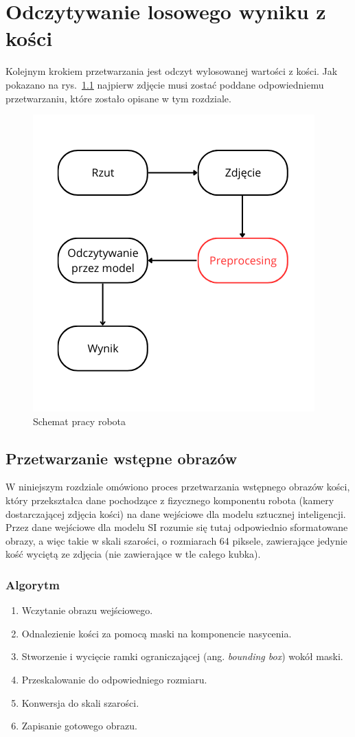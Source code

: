 \chapter{Odczytywanie losowego wyniku z kości}\label{ch:odczytywanie-losowego-wyniku-z-kosci}

Kolejnym krokiem przetwarzania jest odczyt wylosowanej wartości z kości.
Jak pokazano na rys.~\ref{fig:schemat_workflow}
najpierw zdjęcie musi zostać poddane odpowiedniemu przetwarzaniu, które zostało opisane w tym rozdziale.

\begin{figure}[H]
    \centering
    \includegraphics[width=0.5\linewidth]{chapters/04-czytanie/figures/schemat}
    \caption{Schemat pracy robota}
    \label{fig:schemat_workflow}
\end{figure}

\section{Przetwarzanie wstępne obrazów}\label{sec:preprocessing}

W niniejszym rozdziale omówiono proces przetwarzania wstępnego obrazów kości,
który przekształca dane pochodzące z fizycznego komponentu robota (kamery dostarczającej zdjęcia kości) na dane wejściowe dla modelu sztucznej inteligencji.
Przez dane wejściowe dla modelu SI rozumie się tutaj odpowiednio sformatowane obrazy, a więc takie w skali szarości,
o rozmiarach 64 piksele, zawierające jedynie kość wyciętą ze zdjęcia (nie zawierające w tle całego kubka).

\subsection{Algorytm}\label{subsec:algorytm}

\begin{enumerate}
    \item Wczytanie obrazu wejściowego.
    \item Odnalezienie kości za pomocą maski na komponencie nasycenia.
    \item Stworzenie i wycięcie ramki ograniczającej (ang. \textit{bounding box}) wokół maski.
    \item Przeskalowanie do odpowiedniego rozmiaru.
    \item Konwersja do skali szarości.
    \item Zapisanie gotowego obrazu.
\end{enumerate}

